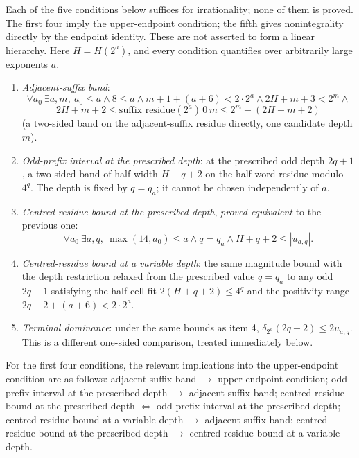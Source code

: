 \begin{prop}
\label{prop:te-chain}
Each of the five conditions below suffices for irrationality; none of them is proved. The first
four imply the upper-endpoint condition;
the fifth gives nonintegrality directly by the endpoint identity. These
are not asserted to form a linear hierarchy. Here $H=H(2^a)$, and every
condition quantifies over arbitrarily large exponents $a$.
\begin{enumerate}[leftmargin=*]
  \item \emph{Adjacent-suffix band}:
    \[
      \forall a_0\ \exists a,m,\ a_0\le a \wedge 8\le a \wedge m{+}1{+}(a{+}6)<2\cdot 2^a \wedge
      2H{+}m{+}3 < 2^m \wedge
    \]
    \[
      2H{+}m{+}2 \le \text{suffix residue}(2^a)\,0\,m \le 2^m - (2H{+}m{+}2)
    \]
    (a two-sided band on the adjacent-suffix residue directly, one candidate depth $m$).
  \item \emph{Odd-prefix interval at the prescribed depth}: at the prescribed odd depth $2q{+}1$, a two-sided band of half-width
    $H{+}q{+}2$ on the half-word residue modulo $4^q$. The depth is fixed
    by $q=q_a$; it cannot be chosen independently of $a$.
  \item \emph{Centred-residue bound at the prescribed depth}, \emph{proved equivalent} to the previous one:
    \[
      \forall a_0\ \exists a,q,\ \max(14,a_0)\le a \wedge q=q_a
      \wedge H{+}q{+}2 \le |u_{a,q}| .
    \]
  \item \emph{Centred-residue bound at a variable depth}: the same magnitude bound with the depth restriction relaxed from
    the prescribed value $q=q_a$ to any odd $2q{+}1$ satisfying the half-cell fit
    $2(H{+}q{+}2)\le 4^q$ and the positivity range $2q{+}2{+}(a{+}6)<2\cdot 2^a$.
  \item \emph{Terminal dominance}: under the same bounds as item 4,
    $\delta_{2^a}(2q+2)\le2u_{a,q}$. This is a different one-sided
    comparison, treated immediately below.
\end{enumerate}
For the first four conditions, the relevant implications into the
upper-endpoint condition are as follows:
adjacent-suffix band $\to$ upper-endpoint condition; odd-prefix interval at the prescribed depth
$\to$ adjacent-suffix band; centred-residue bound at the prescribed depth
$\Leftrightarrow$ odd-prefix interval at the prescribed depth;
centred-residue bound at a variable depth $\to$ adjacent-suffix band;
centred-residue bound at the prescribed depth $\to$ centred-residue bound at a variable depth.
\end{prop}

